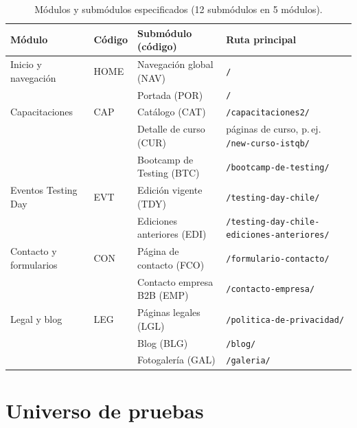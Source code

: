 \documentclass[11pt,a4paper]{article}
\newcommand{\upath}[1]{\nolinkurl{#1}}
\begin{document}
\begin{table}[H]
\centering\small
\begin{tabularx}{\textwidth}{@{}l l X >{\raggedright\arraybackslash}p{}@{}}
\toprule
Módulo & Código & Submódulo (código) & Ruta principal \\
\midrule
Inicio y navegación & HOME & Navegación global (NAV) & \upath{/} \\
 & & Portada (POR) & \upath{/} \\
\midrule
Capacitaciones & CAP & Catálogo (CAT) & \upath{/capacitaciones2/} \\
 & & Detalle de curso (CUR) & 15 páginas de curso, p.\,ej. \upath{/new-curso-istqb/} \\
 & & Bootcamp de Testing (BTC) & \upath{/bootcamp-de-testing/} \\
\midrule
Eventos Testing Day & EVT & Edición vigente (TDY) & \upath{/testing-day-chile/} \\
 & & Ediciones anteriores (EDI) & \upath{/testing-day-chile-ediciones-anteriores/} \\
\midrule
Contacto y formularios & CON & Página de contacto (FCO) & \upath{/formulario-contacto/} \\
 & & Contacto empresa B2B (EMP) & \upath{/contacto-empresa/} \\
\midrule
Legal y blog & LEG & Páginas legales (LGL) & \upath{/politica-de-privacidad/} \\
 & & Blog (BLG) & \upath{/blog/} \\
 & & Fotogalería (GAL) & \upath{/galeria/} \\
\bottomrule
\end{tabularx}
\caption{Módulos y submódulos especificados (12 submódulos en 5 módulos).}
\end{table}

\section{Universo de pruebas}
\end{document}
